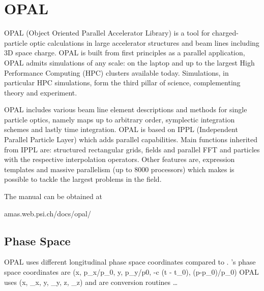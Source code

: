 \chapter{OPAL}
\label{c:opal}

OPAL (Object Oriented Parallel Accelerator Library) is a tool for charged-particle optic
calculations in large accelerator structures and beam lines including 3D space charge. OPAL is built
from first principles as a parallel application, OPAL admits simulations of any scale: on the laptop
and up to the largest High Performance Computing (HPC) clusters available today. Simulations, in
particular HPC simulations, form the third pillar of science, complementing theory and experiment.

OPAL includes various beam line element descriptions and methods for single particle optics, namely
maps up to arbitrary order, symplectic integration schemes and lastly time integration. OPAL is
based on IPPL (Independent Parallel Particle Layer) which adds parallel capabilities. Main functions
inherited from IPPL are: structured rectangular grids, fields and parallel FFT and particles with
the respective interpolation operators. Other features are, expression templates and massive
parallelism (up to 8000 processors) which makes is possible to tackle the largest problems in the
field.

The  manual can be obtained at
\begin{example} 
  amas.web.psi.ch/docs/opal/   
\end{example}

\section{Phase Space}
\label{s:opal.space}

OPAL uses different longitudinal phase space coordinates compared to \bmad.  \bmad's phase space
coordinates are
\Begineq
  (x, p_x/p_0, y, p_y/p0, -\beta c (t - t_0), (p-p_0)/p_0)
\Endeq
OPAL uses
\Begineq
  (x, \gamma \beta_x,  y, \gamma \beta_y, z, \gamma \beta_z)
\Endeq
{} and  are conversion routines \ldots

